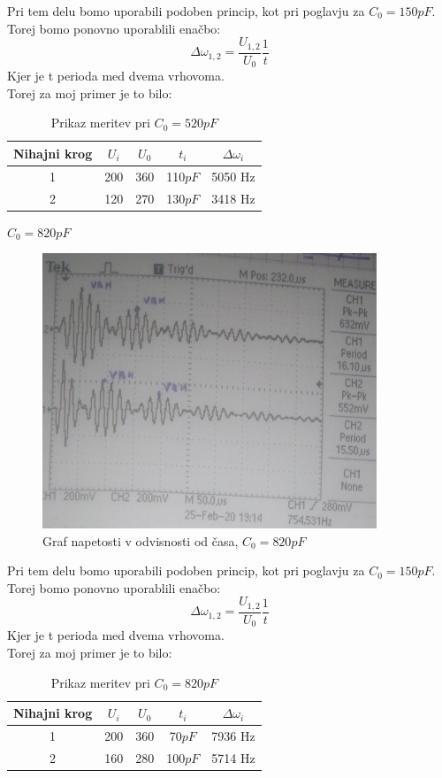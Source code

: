 \documentclass[11pt, a4paper]{article}
\theoremstyle{definition}
\theoremstyle{example}
\theoremstyle{izrek}
\begin{document}
Pri tem delu bomo uporabili podoben princip, kot pri poglavju za $C_0=150pF$. Torej bomo ponovno uporablili enačbo:
$$\Delta \omega_{1,2}=\frac{U_{1,2}}{U_0}\frac{1}{t} $$
Kjer je t perioda med dvema vrhovoma.\\
Torej za moj primer je to bilo: \\
\begin{table}[ht]
	\centering
	\begin{tabular}{|c|c|c|c|c|}
		\hline
		Nihajni krog & $U_i$ & $U_0$ & $ t_i$ & $\Delta \omega_i$ \\
		\hline
		\hline
		1 & 200 & 360 & 110$pF$ & 5050 Hz \\
		\hline
		2 & 120 & 270 & 130$pF$ & 3418 Hz \\
		\hline
		\end{tabular}
		\caption{Prikaz meritev pri $C_0=520pF$}
		\label{tab:FirstTable}
\end{table}

\pagebreak
\textbf{\underline{$C_0=820pF$}}\\

\begin{figure}[htp]
    \centering
    \includegraphics[width=10cm]{820.jpg}
    \caption{Graf napetosti v odvisnosti od časa, $C_0=820 pF$}
\end{figure}

Pri tem delu bomo uporabili podoben princip, kot pri poglavju za $C_0=150pF$. Torej bomo ponovno uporablili enačbo:
$$\Delta \omega_{1,2}=\frac{U_{1,2}}{U_0}\frac{1}{t} $$
Kjer je t perioda med dvema vrhovoma.\\
Torej za moj primer je to bilo: \\
\begin{table}[ht]
	\centering
	\begin{tabular}{|c|c|c|c|c|}
		\hline
		Nihajni krog & $U_i$ & $U_0$ & $ t_i$ & $\Delta \omega_i$ \\
		\hline
		\hline
		1 & 200 & 360 & 70$pF$ & 7936 Hz \\
		\hline
		2 & 160 & 280 & 100$pF$ & 5714 Hz \\
		\hline
		\end{tabular}
		\caption{Prikaz meritev pri $C_0=820pF$}
		\label{tab:FirstTable}
\end{table}
\end{document}
